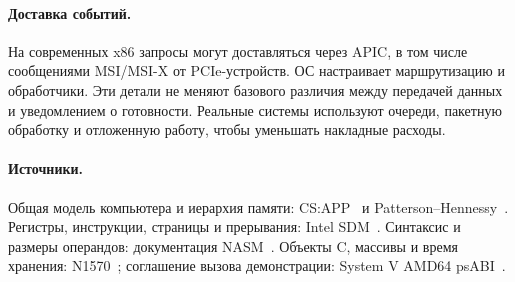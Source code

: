 \paragraph{Доставка событий.}
На современных x86 запросы могут доставляться через APIC, в том числе
сообщениями MSI/MSI-X от PCIe-устройств. ОС настраивает маршрутизацию и
обработчики. Эти детали не меняют базового различия между передачей данных
и уведомлением о готовности. Реальные системы используют очереди, пакетную
обработку и отложенную работу, чтобы уменьшать накладные расходы.

\paragraph{Источники.}
Общая модель компьютера и иерархия памяти: CS:APP~\cite{bryant-ohallaron-csapp}
и Patterson--Hennessy~\cite{patterson-hennessy}. Регистры, инструкции,
страницы и прерывания: Intel SDM~\cite{intel-manual}. Синтаксис и размеры
операндов: документация NASM~\cite{nasm-doc}. Объекты C, массивы и время
хранения: N1570~\cite{c11-draft}; соглашение вызова демонстрации:
System V AMD64 psABI~\cite{amd64-psabi}.
